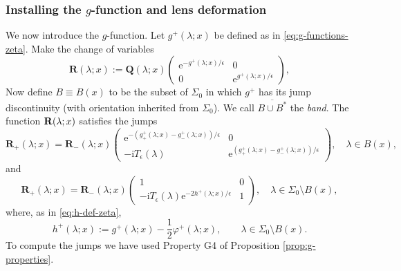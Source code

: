 \documentclass[12pt]{amsart}
\numberwithin{equation}{section}
\newcommand{\ee}{\mathrm{e}}
\newcommand{\ii}{\mathrm{i}}
\newcommand{\SP}{\lambda}
\def\eq{\begin{equation}}
\def\endeq{\end{equation}}
\begin{document}
\subsubsection{Installing the $g$-function and lens deformation}
We now introduce the $g$-function.  Let $g^+(\SP;x)$ be defined as in 
\eqref{eq:g-functions-zeta}.
Make the change of variables 
\begin{equation}
\mathbf{R}(\SP;x):= 
\mathbf{Q}(\SP;x) \begin{pmatrix} \ee^{-g^+(\SP;x)/\epsilon} & 0 \\ 0 & \ee^{g^+(\SP;x)/\epsilon} \end{pmatrix},
\label{eq:Q-to-R-case1}
\end{equation}
Now define $B\equiv B(x)$ to be the subset of $\Sigma_0$ in which $g^+$ has 
its jump discontinuity (with orientation inherited from $\Sigma_0$).  We call 
$\overline{B\cup B^*}$ the \emph{band}.  The function ${\bf R}(\SP;x)$ 
satisfies the jumps 
\eq
\mathbf{R}_+(\SP;x)=\mathbf{R}_-(\SP;x)\begin{pmatrix}\ee^{-(g^{+}_+(\SP;x)-g^{+}_-(\SP;x))/\epsilon} & 0 \\
-\ii T_\epsilon(\SP) & \ee^{(g^{+}_+(\SP;x)-g^{+}_-(\SP;x))/\epsilon} \end{pmatrix}, \quad \SP\in B(x),
\label{eq:Q-jump-cut}
\endeq
and
\begin{equation}
\mathbf{R}_+(\SP;x)=\mathbf{R}_-(\SP;x) \begin{pmatrix} 1 & 0 \\ -\ii T_\epsilon(\SP)\ee^{-2h^{+}(\SP;x)/\epsilon} & 1 \end{pmatrix},\quad
 \SP\in\Sigma_0\setminus B(x),
 \label{eq:jump-above-1}
\end{equation}
where, as in \eqref{eq:h-def-zeta},
\begin{equation}
h^{+}(\SP;x):=g^{+}(\SP;x)-\frac{1}{2}\varphi^{+}(\SP;x),\qquad \SP\in \Sigma_0\setminus B(x). 
\label{eq:h+-def}
\end{equation}
To compute the jumps we have used Property G4 of Proposition \ref{prop:g-properties}.
\end{document}
